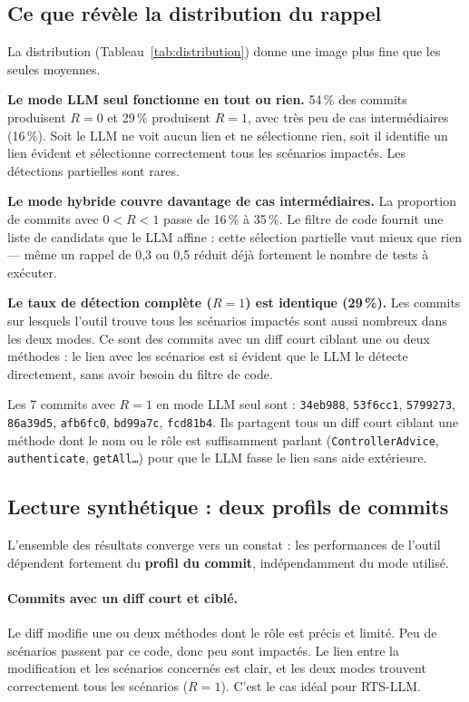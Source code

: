 \documentclass[12pt,a4paper]{article}
\begin{document}
\subsection{Ce que révèle la distribution du rappel}

La distribution (Tableau~\ref{tab:distribution}) donne une image plus fine
que les seules moyennes.

\textbf{Le mode LLM seul fonctionne en tout ou rien.} 54\,\% des commits
produisent $R = 0$ et 29\,\% produisent $R = 1$, avec très peu de cas
intermédiaires (16\,\%). Soit le LLM ne voit aucun lien et ne sélectionne
rien, soit il identifie un lien évident et sélectionne correctement tous
les scénarios impactés. Les détections partielles sont rares.

\textbf{Le mode hybride couvre davantage de cas intermédiaires.}
La proportion de commits avec $0 < R < 1$ passe de 16\,\% à 35\,\%.
Le filtre de code fournit une liste de candidats que le LLM affine :
cette sélection partielle vaut mieux que rien — même un rappel de 0{,}3
ou 0{,}5 réduit déjà fortement le nombre de tests à exécuter.

\textbf{Le taux de détection complète ($R = 1$) est identique (29\,\%).}
Les commits sur lesquels l'outil trouve tous les scénarios impactés sont
aussi nombreux dans les deux modes. Ce sont des commits avec un diff court
ciblant une ou deux méthodes : le lien avec les scénarios est si évident
que le LLM le détecte directement, sans avoir besoin du filtre de code.

\begin{attention}
Les 7 commits avec $R = 1$ en mode LLM seul sont :
\texttt{34eb988}, \texttt{53f6cc1}, \texttt{5799273}, \texttt{86a39d5},
\texttt{afb6fc0}, \texttt{bd99a7c}, \texttt{fcd81b4}.
Ils partagent tous un diff court ciblant une méthode dont le nom ou le rôle
est suffisamment parlant (\texttt{ControllerAdvice}, \texttt{authenticate},
\texttt{getAll\ldots}) pour que le LLM fasse le lien sans aide extérieure.
\end{attention}

\subsection{Lecture synthétique : deux profils de commits}

L'ensemble des résultats converge vers un constat : les performances de
l'outil dépendent fortement du \textbf{profil du commit}, indépendamment
du mode utilisé.

\paragraph{Commits avec un diff court et ciblé.}
Le diff modifie une ou deux méthodes dont le rôle est précis et limité.
Peu de scénarios passent par ce code, donc peu sont impactés. Le lien
entre la modification et les scénarios concernés est clair, et les deux
modes trouvent correctement tous les scénarios ($R = 1$). C'est le cas
idéal pour RTS-LLM.
\end{document}
